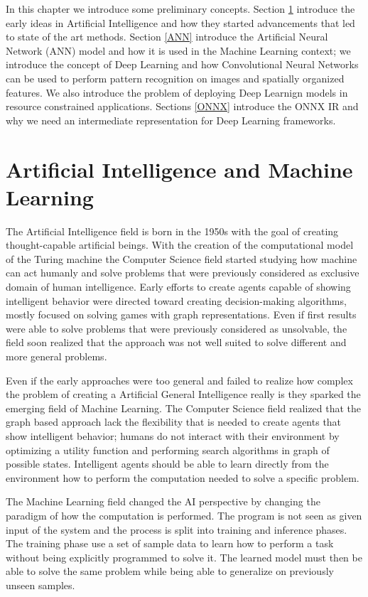 \documentclass[../main.tex]{subfiles}
\begin{document}
In this chapter we introduce some preliminary concepts. 
Section \ref{AI-ML} introduce the early ideas in Artificial Intelligence and how they started advancements that led to state of the art methods.
Section \ref{ANN} introduce the Artificial Neural Network (ANN) model and how it is used in the Machine Learning context; we introduce the concept of Deep Learning and how Convolutional Neural Networks can be used to perform pattern recognition on images and spatially organized features. 
We also introduce the problem of deploying Deep Learnign models in resource constrained applications.
Sections \ref{ONNX} introduce the ONNX IR and why we need an intermediate representation for Deep Learning frameworks.

\newpage

\section{Artificial Intelligence and Machine Learning}
\label{AI-ML}

The Artificial Intelligence field is born in the 1950s with the goal of creating thought-capable artificial beings. 
With the creation of the computational model of the Turing machine the Computer Science field started studying how machine can act humanly and solve problems that were previously considered as exclusive domain of human intelligence.
Early efforts to create agents capable of showing intelligent behavior were directed toward creating decision-making algorithms, mostly focused on solving games with graph representations.
Even if first results were able to solve problems that were previously considered as unsolvable, the field soon realized that the approach was not well suited to solve different and more general problems.

Even if the early approaches were too general and failed to realize how complex the problem of creating a Artificial General Intelligence really is they sparked the emerging field of Machine Learning. 
The Computer Science field realized that the graph based approach lack the flexibility that is needed to create agents that show intelligent behavior; humans do not interact with their environment by optimizing a utility function and performing search algorithms in graph of possible states. 
Intelligent agents should be able to learn directly from the environment how to perform the computation needed to solve a specific problem.


The Machine Learning field changed the AI perspective by changing the paradigm of how the computation is performed. 
The program is not seen as given input of the system and the process is split into training and inference phases. 
The training phase use a set of sample data to learn how to perform a task without being explicitly programmed to solve it. 
The learned model must then be able to solve the same problem while being able to generalize on previously unseen samples.
\end{document}
